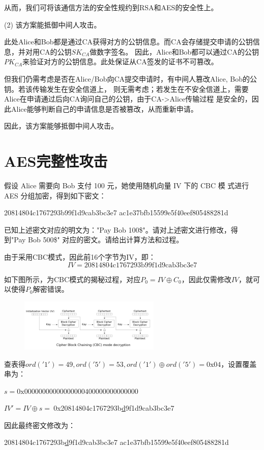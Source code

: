 \begin{Solution}
    从而，我们可将该通信方法的安全性规约到RSA和AES的安全性上。

    \newpage
    (2) 该方案能抵御中间人攻击。

    此处Alice和Bob都是通过CA获得对方的公钥信息。而CA会存储提交申请的公钥信息，并对用CA的公钥$SK_{CA}$做数字签名。
    因此，Alice和Bob都可以通过CA的公钥$PK_{CA}$来验证对方的公钥信息。此处保证从CA签发的证书不可篡改。

    但我们仍需考虑是否在Alice/Bob向CA提交申请时，有中间人篡改Alice, Bob的公钥。若该传输发生在安全信道上，
    则无需考虑；若发生在不安全信道上，需要Alice在申请通过后向CA询问自己的公钥，由于CA->Alice传输过程
    是安全的，因此Alice能够判断自己的申请信息是否被篡改，从而重新申请。

    因此，该方案能够抵御中间人攻击。
    
\end{Solution}

\section{AES完整性攻击}

假设 Alice 需要向 Bob 支付 100 元，她使用随机向量 IV 下的 CBC 模
式进行 AES 分组加密，得到如下密文：

\begin{center}
    20814804c1767293b99f1d9cab3bc3e7 ac1e37bfb15599e5f40eef805488281d
\end{center}
已知上述密文对应的明文为："Pay Bob 100\$"。请对上述密文进行修改，得
到"Pay Bob 500\$" 对应的密文。请给出计算方法和过程。

\begin{Solution}
    由于采用CBC模式，因此前16个字节为IV，即：
    \begin{equation}
        IV = \text{20814804c1767293b99f1d9cab3bc3e7}
    \end{equation}

        如下图所示，为CBC模式的揭秘过程，对应$P_0=IV\oplus C_0$，因此仅需修改$IV$，就可以使得$P_0$解密错误。
    \begin{figure}[!htbp]
        \centering
        \includegraphics[width=0.6\textwidth]{figures/cbc_decryption.png}
    \end{figure}
    
    查表得$ord('1') = 49, ord('5') = 53, ord('1') \oplus ord('5') = 0\text{x}04$，设置覆盖串为：

    $s = \text{0x00000000000000000400000000000000}$

    $IV' = IV \oplus s =~$0x20814804c1767293b\underline{d}9f1d9cab3bc3e7

    因此最终密文修改为：
    \begin{center}
        20814804c1767293b\underline{d}9f1d9cab3bc3e7 ac1e37bfb15599e5f40eef805488281d
    \end{center}
\end{Solution}